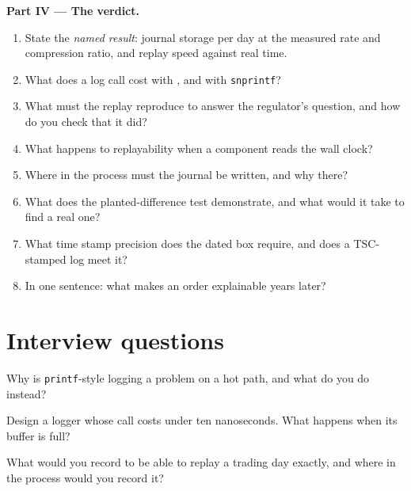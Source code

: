 \begin{problem}
\medskip\noindent\textbf{Part IV --- The verdict.}
\begin{enumerate}[resume]
\item State the \emph{named result}: journal storage per day at the measured rate and compression ratio, and replay speed
against real time.
\item What does a log call cost with , and with \texttt{snprintf}?
\item What must the replay reproduce to answer the regulator's question, and how do you check that it did?
\item What happens to replayability when a component reads the wall clock?
\item Where in the process must the journal be written, and why there?
\item What does the planted-difference test demonstrate, and what would it take to find a real one?
\item What time stamp precision does the dated box require, and does a TSC-stamped log meet it?
\item In one sentence: what makes an order explainable years later?
\end{enumerate}
\end{problem}

\section{Interview questions}

\begin{interviewq}\label{iq:ll:logging-capture-and-replay:1}
Why is \texttt{printf}-style logging a problem on a hot path, and what do you do instead?
\end{interviewq}

\begin{interviewq}\label{iq:ll:logging-capture-and-replay:2}
Design a logger whose call costs under ten nanoseconds. What happens when its buffer is full?
\end{interviewq}

\begin{interviewq}\label{iq:ll:logging-capture-and-replay:3}
What would you record to be able to replay a trading day exactly, and where in the process would you record it?
\end{interviewq}

